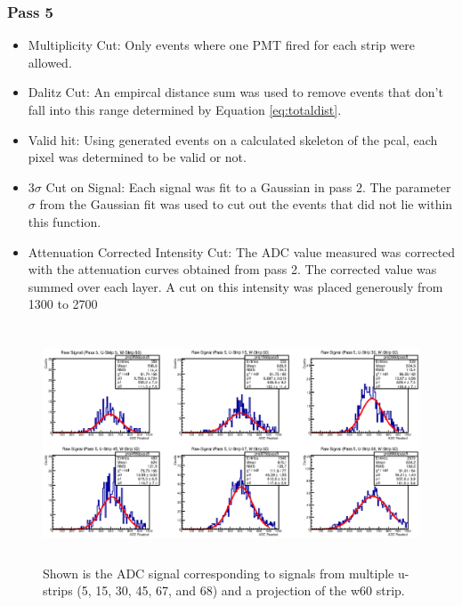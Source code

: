 \subsubsection{Pass 5}
\begin{itemize}
    \item Multiplicity Cut: Only events where one PMT fired for each strip were allowed.
    \item Dalitz Cut: An empircal distance sum was used to remove events that don't fall 
    into this range determined by Equation \ref{eq:totaldist}.
    \item Valid hit: Using generated events on a calculated skeleton of the pcal, each pixel 
    was determined to be valid or not.
    \item 3$\sigma$ Cut on Signal: Each signal was fit to a Gaussian in pass 2. The parameter 
    $\sigma$ from the Gaussian fit was used to cut out the events that did not lie within this function.
    \item Attenuation Corrected Intensity Cut: The ADC value measured was corrected with the 
    attenuation curves obtained from pass 2. The corrected value was summed over each layer. 
    A cut on this intensity was placed generously from 1300 to 2700
\end{itemize}
               
               


\begin{figure}[h]
    \centering
    \includegraphics[height= 2.75in, keepaspectratio = true]{pass5}
    \caption{Shown is the ADC signal corresponding to signals from multiple u-strips 
    (5, 15, 30, 45, 67, and 68) and a projection of the w60 strip.}
    \label{fig:pass5}
\end{figure}

